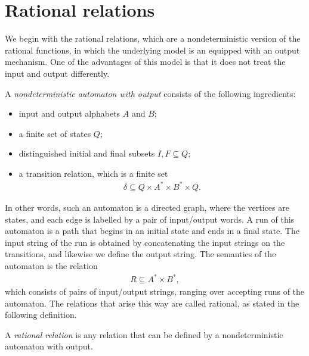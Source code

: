\section{Rational relations}
\label{sec:rational-relations}

We  begin with the rational relations, which are a nondeterministic version of the rational functions, in which the underlying model is an \nfa equipped with an output mechanism. One of the advantages of this model is that it does not treat the input and output differently. 

\begin{definition}\label{def:nfa-with-output}
    A \emph{nondeterministic automaton with output} consists of the following ingredients:
    \begin{itemize}
        \item input and output alphabets $A$ and $B$;
        \item a finite set of states $Q$;
        \item distinguished initial and final subsets $I, F \subseteq Q$;
        \item a transition relation, which is a finite set 
        \begin{align*}
        \delta \subseteq Q \times A^* \times B^* \times Q. 
        \end{align*}
    \end{itemize}
\end{definition}

In other words, such an automaton is a directed graph, where the vertices are states, and each edge is labelled by a pair of input/output words. A run of this automaton is a path that begins in an initial state and ends in a final state. The input string of the run is obtained by concatenating the input strings on the transitions, and likewise we define the output string. The semantics of the automaton is the relation 
\begin{align*}
R \subseteq A^* \times B^*,
\end{align*}
which consists of pairs of input/output strings, ranging over accepting runs of the automaton. The relations that arise this way are called rational, as stated in the following definition. 
\begin{definition}
    \label{def:rational-relation}
    A \emph{rational relation} is any relation that can be defined by a nondeterministic automaton with output.
\end{definition}

